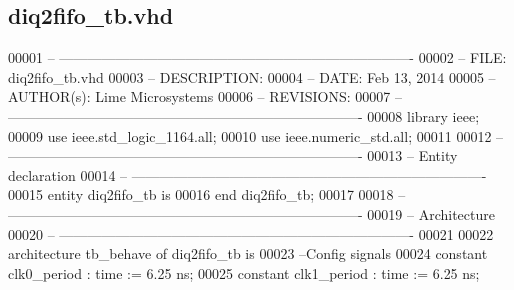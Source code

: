 \subsection{diq2fifo\+\_\+tb.\+vhd}
\label{diq2fifo__tb_8vhd_source}

\begin{DoxyCode}
00001 \textcolor{keyword}{-- ---------------------------------------------------------------------------- }
00002 \textcolor{keyword}{-- FILE:    diq2fifo\_tb.vhd}
00003 \textcolor{keyword}{-- DESCRIPTION: }
00004 \textcolor{keyword}{-- DATE:    Feb 13, 2014}
00005 \textcolor{keyword}{-- AUTHOR(s):   Lime Microsystems}
00006 \textcolor{keyword}{-- REVISIONS:}
00007 \textcolor{keyword}{-- ---------------------------------------------------------------------------- }
00008 \textcolor{vhdlkeyword}{library }\textcolor{keywordflow}{ieee};
00009 \textcolor{vhdlkeyword}{use }ieee.std\_logic\_1164.\textcolor{keywordflow}{all};
00010 \textcolor{vhdlkeyword}{use }ieee.numeric\_std.\textcolor{keywordflow}{all};
00011 
00012 \textcolor{keyword}{-- ----------------------------------------------------------------------------}
00013 \textcolor{keyword}{-- Entity declaration}
00014 \textcolor{keyword}{-- ----------------------------------------------------------------------------}
00015 \textcolor{keywordflow}{entity }diq2fifo_tb \textcolor{keywordflow}{is}
00016 \textcolor{keywordflow}{end} \textcolor{vhdlchar}{diq2fifo\_tb};
00017 
00018 \textcolor{keyword}{-- ----------------------------------------------------------------------------}
00019 \textcolor{keyword}{-- Architecture}
00020 \textcolor{keyword}{-- ----------------------------------------------------------------------------}
00021 
00022 \textcolor{keywordflow}{architecture} tb\_behave \textcolor{keywordflow}{of} diq2fifo_tb is
00023 \textcolor{keyword}{    --Config signals}
00024     \textcolor{keywordflow}{constant} \textcolor{vhdlchar}{clk0_period}   \textcolor{vhdlchar}{:} \textcolor{comment}{time} \textcolor{vhdlchar}{:=} \textcolor{vhdllogic}{}\textcolor{vhdllogic}{6}.\textcolor{vhdllogic}{25} \textcolor{vhdlchar}{ns};
00025     \textcolor{keywordflow}{constant} \textcolor{vhdlchar}{clk1_period}   \textcolor{vhdlchar}{:} \textcolor{comment}{time} \textcolor{vhdlchar}{:=} \textcolor{vhdllogic}{}\textcolor{vhdllogic}{6}.\textcolor{vhdllogic}{25} \textcolor{vhdlchar}{ns}; 

\end{DoxyCode}
